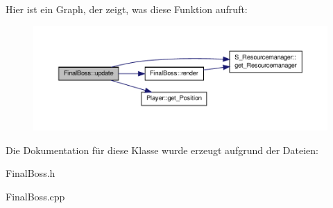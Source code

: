 Hier ist ein Graph, der zeigt, was diese Funktion aufruft\-:
\nopagebreak
\begin{figure}[H]
\begin{center}
\leavevmode
\includegraphics[width=350pt]{class_final_boss_a201e58c54ae09fbfd97bf6ef4fb2843f_cgraph}
\end{center}
\end{figure}




Die Dokumentation für diese Klasse wurde erzeugt aufgrund der Dateien\-:\begin{DoxyCompactItemize}
\item 
Final\-Boss.\-h\item 
Final\-Boss.\-cpp\end{DoxyCompactItemize}
